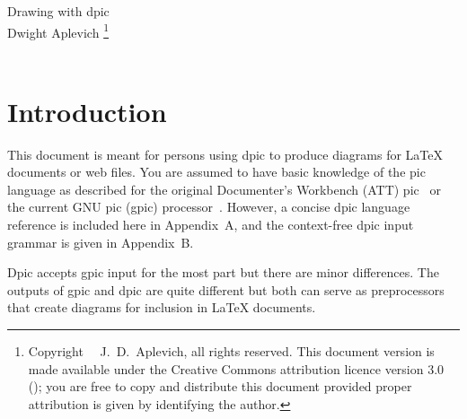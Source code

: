 \documentclass[11pt]{article}
\newcommand{\bq}{}
\newcommand{\Dpic}{{\bq Dpic}\xspace}
\renewcommand{\LaTeX}{{LaTeX}\xspace}
\begin{document}
%
\begin{centering}
{\LARGE Drawing with dpic}\\
{\large
Dwight Aplevich%
\footnote{Copyright \textcopyright\ \the\year\ J.\ D.\ Aplevich,
  all rights reserved.  This document version is made available
  under the Creative Commons attribution licence version 3.0
  ();
  you are free to copy
  and distribute this document provided proper attribution is given by
  identifying the author.
  }\\
}\\
\end{centering}

%
\begin{multicols}{2}
\tableofcontents
\end{multicols}
\section{Introduction}

This document is meant for persons using dpic to produce diagrams for
\LaTeX documents or web files.  You are assumed to have basic knowledge
of the pic language as described for the original Documenter's
Workbench (ATT) pic~\cite{KRpic} or the
current GNU pic (gpic) processor~\cite{Raymond95}.
However, a concise dpic language reference is included here in
Appendix~A, and the context-free dpic input grammar is given in Appendix~B.

\Dpic accepts gpic input for the most part but
there are minor differences.  The outputs of gpic and dpic are quite
different but both can serve as preprocessors that create diagrams for
inclusion in LaTeX documents.
\end{document}
